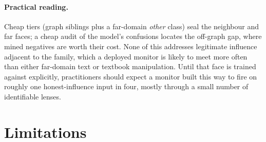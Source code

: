 \documentclass[11pt]{article}
\begin{document}
\paragraph{Practical reading.} Cheap tiers (graph siblings plus a far-domain \emph{other} class) seal the
neighbour and far faces; a cheap audit of the model's confusions locates the off-graph gap, where mined negatives
are worth their cost. None of this addresses legitimate influence adjacent to the family, which a deployed monitor
is likely to meet more often than either far-domain text or textbook manipulation. Until that face is trained
against explicitly, practitioners should expect a monitor built this way to fire on roughly one honest-influence
input in four, mostly through a small number of identifiable lenses.

\section{Limitations}
\label{sec:limits}
\end{document}
